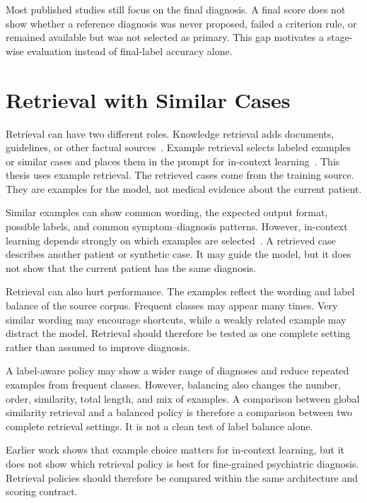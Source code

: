 Most published studies still focus on the final diagnosis. A final score does not show whether a reference diagnosis was never proposed, failed a criterion rule, or remained available but was not selected as primary. This gap motivates a stage-wise evaluation instead of final-label accuracy alone.

\section{Retrieval with Similar Cases}

Retrieval can have two different roles. Knowledge retrieval adds documents, guidelines, or other factual sources~\citep{lewis2020rag}. Example retrieval selects labeled examples or similar cases and places them in the prompt for in-context learning~\citep{liu2022incontext}. This thesis uses example retrieval. The retrieved cases come from the training source. They are examples for the model, not medical evidence about the current patient.

Similar examples can show common wording, the expected output format, possible labels, and common symptom--diagnosis patterns. However, in-context learning depends strongly on which examples are selected~\citep{liu2022incontext}. A retrieved case describes another patient or synthetic case. It may guide the model, but it does not show that the current patient has the same diagnosis.

Retrieval can also hurt performance. The examples reflect the wording and label balance of the source corpus. Frequent classes may appear many times. Very similar wording may encourage shortcuts, while a weakly related example may distract the model. Retrieval should therefore be tested as one complete setting rather than assumed to improve diagnosis.

A label-aware policy may show a wider range of diagnoses and reduce repeated examples from frequent classes. However, balancing also changes the number, order, similarity, total length, and mix of examples. A comparison between global similarity retrieval and a balanced policy is therefore a comparison between two complete retrieval settings. It is not a clean test of label balance alone.

Earlier work shows that example choice matters for in-context learning, but it does not show which retrieval policy is best for fine-grained psychiatric diagnosis. Retrieval policies should therefore be compared within the same architecture and scoring contract.

